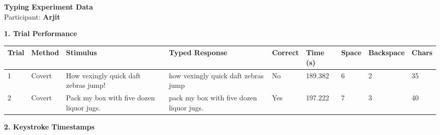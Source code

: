 \documentclass[10pt,a4paper]{article}
\begin{document}

\begin{center}
    {\Large\bfseries Typing Experiment Data}\\
    \vspace{2pt}
    Participant: \textbf{Arjit}
\end{center}

\vspace{0.25cm}


\noindent
{\large\bfseries 1. Trial Performance}

\vspace{0.08cm}

\begin{center}
\begin{tabularx}{\textwidth}{
    C{0.45in}
    C{0.65in}
    L{2.35in}
    L{2.55in}
    C{0.65in}
    C{0.65in}
    C{0.55in}
    C{0.75in}
    C{0.55in}
}
\toprule

\textbf{Trial} &
\textbf{Method} &
\textbf{Stimulus} &
\textbf{Typed Response} &
\textbf{Correct} &
\textbf{Time (s)} &
\textbf{Space} &
\textbf{Backspace} &
\textbf{Chars}
\\

\midrule

1 &
Covert &
How vexingly quick daft zebras jump! &
how vexingly quick daft zebras jump &
No &
189.382 &
6 &
2 &
35
\\

2 &
Covert &
Pack my box with five dozen liquor jugs. &
pack my box with five dozen liquor jugs. &
Yes &
197.222 &
7 &
3 &
40
\\

\bottomrule
\end{tabularx}
\end{center}

\vspace{0.35cm}


\noindent
{\large\bfseries 2. Keystroke Timestamps}

\vspace{0.08cm}
\end{document}
